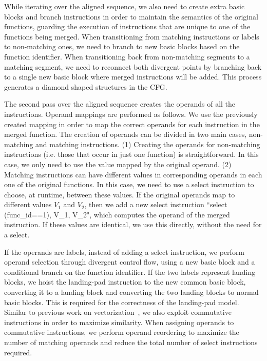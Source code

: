 While iterating over the aligned sequence, we also need to create extra basic
blocks and branch instructions in order to maintain the semantics of the
original functions, guarding the execution of instructions that are unique to
one of the functions being merged.
When transitioning from matching instructions or labels to non-matching ones,
we need to branch to new basic blocks based on the function identifier.
When transitioning back from non-matching segments to a matching segment, we need
to reconnect both divergent points by branching back to a single new basic block
where merged instructions will be added.
This process generates a diamond shaped structures in the CFG. %



The second pass over the aligned sequence creates the operands of all the instructions.
Operand mappings are performed as follows.
We use the previously created mapping in order to map the correct operands for each instruction in the merged function. The creation of operands can be divided in two main cases, non-matching and matching instructions. (1) Creating the operands for non-matching instructions (i.e. those that occur in just one function) is straightforward. In this case, we only need to use the value mapped by the original operand. (2) Matching instructions can have different values in corresponding operands in each one of the original functions. In this case, we need to use a select instruction to choose, at runtime, between these values. If the original operands map to different values $V_1$ and $V_2$, then we add a new select instruction ``select (func\_id==1), V\_1, V\_2", which computes the operand of the merged instruction. If these values are identical, we use this directly, without the need for a select.

If the operands are labels, instead of adding a select instruction, we perform
operand selection through divergent control flow, using a new basic
block and a conditional branch on the function identifier.
If the two labels represent landing blocks, we hoist the landing-pad
instruction to the new common basic block, converting it to a landing block and
converting the two landing blocks to normal basic blocks.
This is required for the correctness of the landing-pad model.
Similar to previous work on vectorization~\cite{porpodas18}, we
also exploit commutative instructions in order to maximize similarity.
When assigning operands to commutative instructions, we perform operand
reordering to maximize the number of matching operands and reduce the total
number of select instructions required.

